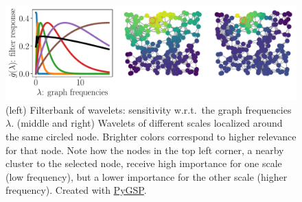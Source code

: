\documentclass{article}
\begin{document}
\begin{figure}%
	\begin{center}
		\centerline{\includegraphics[width=\columnwidth]{wavelets}}
		\vskip -0.1in
		\caption{
			(left) Filterbank of wavelets: sensitivity w.r.t.\ the graph frequencies $\lambda$. (middle and right) Wavelets of different scales localized around the same circled node. Brighter colors correspond to higher relevance for that node. Note how the nodes in the top left corner, a nearby cluster to the selected node, receive high importance for one scale (low frequency), but a lower importance for the other scale (higher frequency). Created with \href{https://pygsp.readthedocs.io}{PyGSP}. %
		}
		\label{fig:wavelets}
	\end{center}
	\vskip -0.4in
\end{figure}


\end{document}
